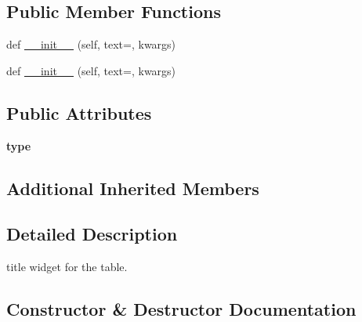 \subsection*{Public Member Functions}
\begin{DoxyCompactItemize}
\item 
def \hyperlink{classremi_1_1gui_1_1TableTitle_ae80a9e1a98010f516763cd871d28bc87}{\+\_\+\+\_\+init\+\_\+\+\_\+} (self, text=\textquotesingle{}\textquotesingle{}, kwargs)
\item 
def \hyperlink{classremi_1_1gui_1_1TableTitle_ae80a9e1a98010f516763cd871d28bc87}{\+\_\+\+\_\+init\+\_\+\+\_\+} (self, text=\textquotesingle{}\textquotesingle{}, kwargs)
\end{DoxyCompactItemize}
\subsection*{Public Attributes}
\begin{DoxyCompactItemize}
\item 
{\bfseries type}\hypertarget{classremi_1_1gui_1_1TableTitle_abbf3501b7d399daafd88734b7ef85752}{}\label{classremi_1_1gui_1_1TableTitle_abbf3501b7d399daafd88734b7ef85752}

\end{DoxyCompactItemize}
\subsection*{Additional Inherited Members}


\subsection{Detailed Description}
\begin{DoxyVerb}title widget for the table.\end{DoxyVerb}
 

\subsection{Constructor \& Destructor Documentation}
